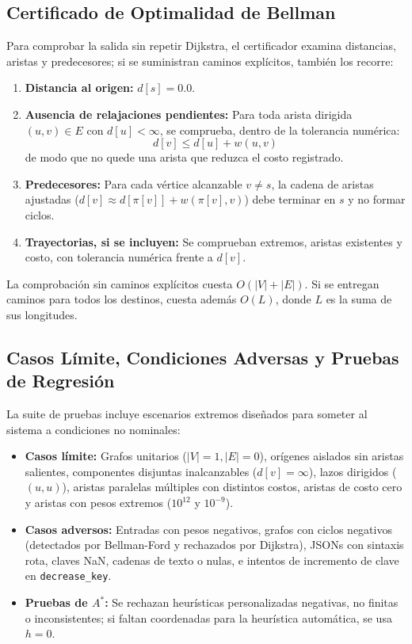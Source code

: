 \subsection{Certificado de Optimalidad de Bellman}
Para comprobar la salida sin repetir Dijkstra, el certificador examina distancias, aristas y predecesores; si se suministran caminos explícitos, también los recorre:
\begin{enumerate}
    \item \textbf{Distancia al origen:} $d[s] = 0.0$.
    \item \textbf{Ausencia de relajaciones pendientes:} Para toda arista dirigida $(u, v) \in E$ con $d[u] < \infty$, se comprueba, dentro de la tolerancia numérica:
    \begin{equation}
        d[v] \le d[u] + w(u, v)
    \end{equation}
    de modo que no quede una arista que reduzca el costo registrado.
    \item \textbf{Predecesores:} Para cada vértice alcanzable $v\ne s$, la cadena de aristas ajustadas ($d[v]\approx d[\pi[v]]+w(\pi[v],v)$) debe terminar en $s$ y no formar ciclos.
    \item \textbf{Trayectorias, si se incluyen:} Se comprueban extremos, aristas existentes y costo, con tolerancia numérica frente a $d[v]$.
\end{enumerate}
La comprobación sin caminos explícitos cuesta $O(|V|+|E|)$. Si se entregan caminos para todos los destinos, cuesta además $O(L)$, donde $L$ es la suma de sus longitudes.

\subsection{Casos Límite, Condiciones Adversas y Pruebas de Regresión}
La suite de pruebas incluye escenarios extremos diseñados para someter al sistema a condiciones no nominales:
\begin{itemize}
    \item \textbf{Casos límite:} Grafos unitarios ($|V|=1, |E|=0$), orígenes aislados sin aristas salientes, componentes disjuntas inalcanzables ($d[v]=\infty$), lazos dirigidos ($(u, u)$), aristas paralelas múltiples con distintos costos, aristas de costo cero y aristas con pesos extremos ($10^{12}$ y $10^{-9}$).
    \item \textbf{Casos adversos:} Entradas con pesos negativos, grafos con ciclos negativos (detectados por Bellman-Ford y rechazados por Dijkstra), JSONs con sintaxis rota, claves NaN, cadenas de texto o nulas, e intentos de incremento de clave en \texttt{decrease\_key}.
    \item \textbf{Pruebas de $A^*$:} Se rechazan heurísticas personalizadas negativas, no finitas o inconsistentes; si faltan coordenadas para la heurística automática, se usa $h=0$.
\end{itemize}

